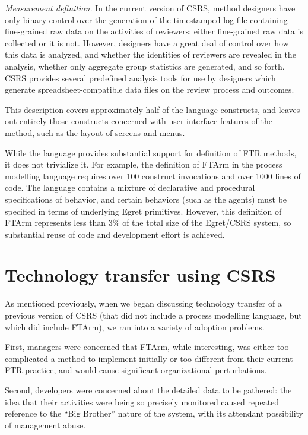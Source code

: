 \begin{itemizenoindent}
\item {\em Measurement definition.}  In the current version of CSRS,
  method designers have only binary control over the generation of the
  timestamped log file containing fine-grained raw data on the activities
  of reviewers: either fine-grained raw data is collected or it is not.
  However, designers have a great deal of control over how this data is
  analyzed, and whether the identities of reviewers are revealed in the
  analysis, whether only aggregate group statistics are generated, and so
  forth.  CSRS provides several predefined analysis tools for use by designers
  which generate spreadsheet-compatible data files on the review process
  and outcomes. 

\end{itemizenoindent}

This description covers approximately half of the language constructs, and
leaves out entirely those constructs concerned with user interface features
of the method, such as the layout of screens and menus.

While the language provides substantial support for definition of FTR
methods, it does not trivialize it. For example, the definition of FTArm in
the process modelling language requires over 100 construct invocations and
over 1000 lines of code. The language contains a mixture of declarative and
procedural specifications of behavior, and certain behaviors (such as the
agents) must be specified in terms of underlying Egret primitives.
However, this definition of FTArm represents less than 3\% of the total
size of the Egret/CSRS system, so substantial reuse of code and development
effort is achieved.


\section{Technology transfer using CSRS}

As mentioned previously, when we began discussing technology transfer of a
previous version of CSRS (that did not include a process modelling
language, but which did include FTArm), we ran into a variety of adoption
problems.  

First, managers were concerned that FTArm, while interesting, was
either too complicated a method to implement initially or too different
from their current FTR practice, and would cause significant organizational
perturbations.  

Second, developers were concerned about the detailed data to be
gathered: the idea that their activities were being so precisely monitored
caused repeated reference to the ``Big Brother'' \cite{Orwell84} nature of
the system, with its attendant possibility of management abuse.

